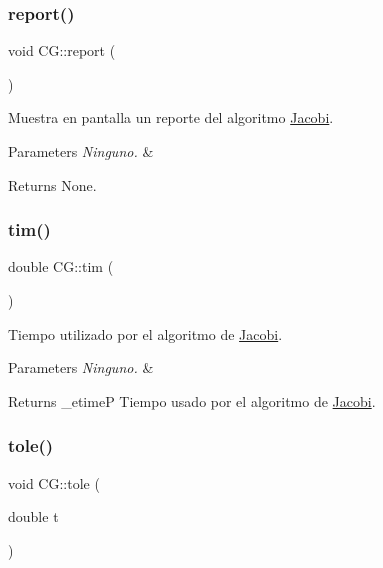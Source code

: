 \subsubsection{\texorpdfstring{report()}{report()}}
{\footnotesize\ttfamily void C\+G\+::report (\begin{DoxyParamCaption}{ }\end{DoxyParamCaption})\hspace{0.3cm}{\ttfamily [inline]}}



Muestra en pantalla un reporte del algoritmo \hyperlink{class_jacobi}{Jacobi}. 


\begin{DoxyParams}{Parameters}
{\em Ninguno.} & \\
\hline
\end{DoxyParams}
\begin{DoxyReturn}{Returns}
None. 
\end{DoxyReturn}
\hypertarget{class_c_g_ab1de59d8f4f6aa5c04a604db85bb7b2a}{}\label{class_c_g_ab1de59d8f4f6aa5c04a604db85bb7b2a} 
\subsubsection{\texorpdfstring{tim()}{tim()}}
{\footnotesize\ttfamily double C\+G\+::tim (\begin{DoxyParamCaption}{ }\end{DoxyParamCaption})\hspace{0.3cm}{\ttfamily [inline]}}



Tiempo utilizado por el algoritmo de \hyperlink{class_jacobi}{Jacobi}. 


\begin{DoxyParams}{Parameters}
{\em Ninguno.} & \\
\hline
\end{DoxyParams}
\begin{DoxyReturn}{Returns}
\+\_\+etimeP Tiempo usado por el algoritmo de \hyperlink{class_jacobi}{Jacobi}. 
\end{DoxyReturn}
\hypertarget{class_c_g_a2153a35147089adbfb44eb1ec99ae982}{}\label{class_c_g_a2153a35147089adbfb44eb1ec99ae982} 
\subsubsection{\texorpdfstring{tole()}{tole()}}
{\footnotesize\ttfamily void C\+G\+::tole (\begin{DoxyParamCaption}\item[{double}]{t }\end{DoxyParamCaption})\hspace{0.3cm}{\ttfamily [inline]}}



